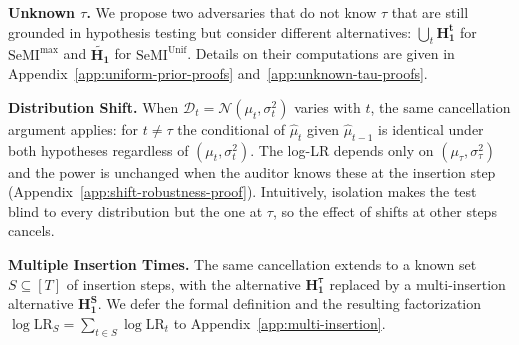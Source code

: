 \documentclass{article}
\theoremstyle{plain}
\theoremstyle{definition}
\theoremstyle{remark}
\newcommand{\cN}{\ensuremath{\mathcal{N}}}
\newcommand{\cP}{\ensuremath{\mathcal{P}}}
\newcommand{\cD}{\ensuremath{\mathcal{D}}}
\newcommand{\SeMIunif}{\mathrm{SeMI}^{\mathrm{Unif}}}
\newcommand{\SeMImax}{\mathrm{SeMI}^{\max}}
\newcommand{\todoe}[1]{\todo[inline]{\small #1}}
\begin{document}
\textbf{Unknown $\tau$.} We propose two adversaries that do not know $\tau$ that are still grounded in hypothesis testing but consider different alternatives: $\bigcup_t \mathbf{H_1^t}$ for $\SeMImax$ and $\widetilde{\mathbf{H_1}}$ for $\SeMIunif$. Details on their computations are given in  Appendix~\ref{app:uniform-prior-proofs} and~\ref{app:unknown-tau-proofs}.




\textbf{Distribution Shift.} When $\cD_t = \cN(\mu_t, \sigma_t^2)$ varies with $t$, the same cancellation argument applies: for $t \neq \tau$ the conditional of $\hat{\mu}_t$ given $\hat{\mu}_{t-1}$ is identical under both hypotheses regardless of $(\mu_t, \sigma_t^2)$. The log-LR depends only on $(\mu_\tau, \sigma_\tau^2)$ and the power is unchanged when the auditor knows these at the insertion step (Appendix~\ref{app:shift-robustness-proof}). Intuitively, isolation makes the test blind to every distribution but the one at $\tau$, so the effect of shifts at other steps cancels.

\textbf{Multiple Insertion Times.} The same cancellation extends to a known set $S \subseteq [T]$ of insertion steps, with the alternative $\mathbf{H_1^\tau}$ replaced by a multi-insertion alternative $\mathbf{H_1^S}$.
We defer the formal definition and the resulting factorization $\log\mathrm{LR}_S = \sum_{t \in S} \log\mathrm{LR}_t$ to Appendix~\ref{app:multi-insertion}.
\end{document}
